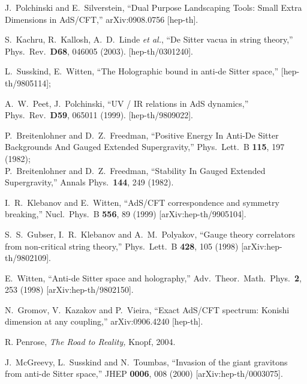 \documentclass[12pt]{article}
\begin{document}
{\begin{thebibliography}{99}
  J.~Polchinski and E.~Silverstein,
  ``Dual Purpose Landscaping Tools: Small Extra Dimensions in AdS/CFT,''
  arXiv:0908.0756 [hep-th].

  S.~Kachru, R.~Kallosh, A.~D.~Linde {\it et al.},
  ``De Sitter vacua in string theory,''
  Phys.\ Rev.\  {\bf D68}, 046005 (2003).
  [hep-th/0301240].
    
  L.~Susskind, E.~Witten,
  ``The Holographic bound in anti-de Sitter space,''
  [hep-th/9805114];

  A.~W.~Peet, J.~Polchinski,
  ``UV / IR relations in AdS dynamics,''
  Phys.\ Rev.\  {\bf D59}, 065011 (1999).
  [hep-th/9809022].

 
  P.~Breitenlohner and D.~Z.~Freedman,
  ``Positive Energy In Anti-De Sitter Backgrounds And Gauged Extended
  Supergravity,''
  Phys.\ Lett.\  B {\bf 115}, 197 (1982);\\
  P.~Breitenlohner and D.~Z.~Freedman,
  ``Stability In Gauged Extended Supergravity,''
  Annals Phys.\  {\bf 144}, 249 (1982).
  
  I.~R.~Klebanov and E.~Witten,
  ``AdS/CFT correspondence and symmetry breaking,''
  Nucl.\ Phys.\  B {\bf 556}, 89 (1999)
  [arXiv:hep-th/9905104].
  
  S.~S.~Gubser, I.~R.~Klebanov and A.~M.~Polyakov,
  ``Gauge theory correlators from non-critical string theory,''
  Phys.\ Lett.\  B {\bf 428}, 105 (1998)
  [arXiv:hep-th/9802109].

  E.~Witten,
  ``Anti-de Sitter space and holography,''
  Adv.\ Theor.\ Math.\ Phys.\  {\bf 2}, 253 (1998)
  [arXiv:hep-th/9802150].
  
  N.~Gromov, V.~Kazakov and P.~Vieira,
  ``Exact AdS/CFT spectrum: Konishi dimension at any coupling,''
  arXiv:0906.4240 [hep-th].
  
R. Penrose, {\it The Road to Reality,} Knopf, 2004.

  J.~McGreevy, L.~Susskind and N.~Toumbas,
  ``Invasion of the giant gravitons from anti-de Sitter space,''
  JHEP {\bf 0006}, 008 (2000)
  [arXiv:hep-th/0003075].


\end{thebibliography}}
\end{document}
